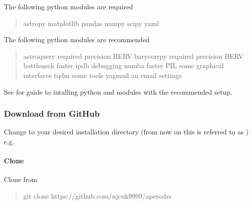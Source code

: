 \documentclass[a4paper,10pt,english]{report}
\begin{document}
The following python modules are required
\begin{quote}

\begin{sphinxVerbatim}[commandchars=\\\{\}]
astropy
matplotlib
pandas
numpy
scipy
yaml
\end{sphinxVerbatim}
\end{quote}

The following python modules are recommended
\begin{quote}

\begin{sphinxVerbatim}[commandchars=\\\{\}]
astroquery required  precision BERV
barycorrpy required  precision BERV
bottleneck faster
ipdb       debugging
numba      faster
PIL        some graphical interfaces
tqdm        some tools
yagmail     an email settings
\end{sphinxVerbatim}
\end{quote}

See {\hyperref[\detokenize{misc/pythoninstallation:python-installation}]{}} for guide to intalling python and modules with
the recommended setup.


\subsubsection{Download from GitHub}
\label{\detokenize{user/general/installation:download-from-github}}\label{\detokenize{user/general/installation:installation-download}}
Change to your desired installation directory (from now on this is referred to
as {\hyperref[\detokenize{misc/glossary:term-drs-root}]{}}) e.g. 


\paragraph{Clone}
\label{\detokenize{user/general/installation:clone}}
Clone from 
\begin{quote}

\begin{sphinxVerbatim}[commandchars=\\\{\}]
git clone https://github.com/njcuk9999/apero\PYGZhy{}drs
\end{sphinxVerbatim}
\end{quote}
\end{document}
